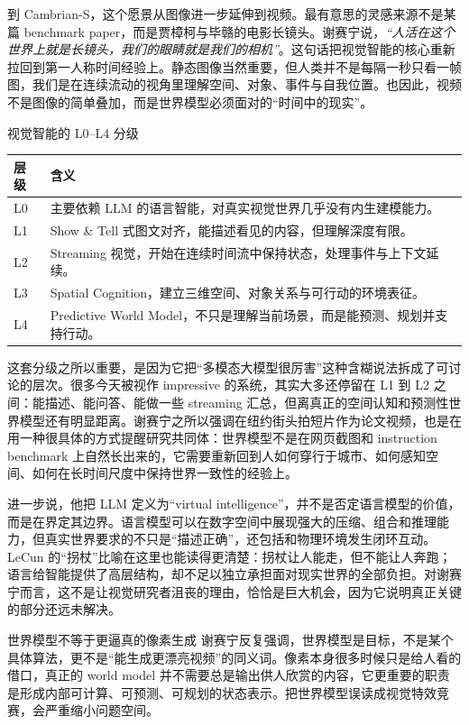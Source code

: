 \documentclass[a4paper,12pt]{article}
\begin{document}
到 Cambrian-S，这个愿景从图像进一步延伸到视频。最有意思的灵感来源不是某篇 benchmark paper，而是贾樟柯与毕赣的电影长镜头。谢赛宁说，\textit{``人活在这个世界上就是长镜头，我们的眼睛就是我们的相机''}。这句话把视觉智能的核心重新拉回到第一人称时间经验上。静态图像当然重要，但人类并不是每隔一秒只看一帧图，我们是在连续流动的视角里理解空间、对象、事件与自我位置。也因此，视频不是图像的简单叠加，而是世界模型必须面对的“时间中的现实”。

\begin{importantbox}{视觉智能的 L0--L4 分级}
\begin{tabularx}{\textwidth}{>{\raggedright\arraybackslash}p{} Y}
\toprule
层级 & 含义 \\
\midrule
L0 & 主要依赖 LLM 的语言智能，对真实视觉世界几乎没有内生建模能力。 \\
L1 & Show \& Tell 式图文对齐，能描述看见的内容，但理解深度有限。 \\
L2 & Streaming 视觉，开始在连续时间流中保持状态，处理事件与上下文延续。 \\
L3 & Spatial Cognition，建立三维空间、对象关系与可行动的环境表征。 \\
L4 & Predictive World Model，不只是理解当前场景，而是能预测、规划并支持行动。 \\
\bottomrule
\end{tabularx}
\end{importantbox}

这套分级之所以重要，是因为它把“多模态大模型很厉害”这种含糊说法拆成了可讨论的层次。很多今天被视作 impressive 的系统，其实大多还停留在 L1 到 L2 之间：能描述、能问答、能做一些 streaming 汇总，但离真正的空间认知和预测性世界模型还有明显距离。谢赛宁之所以强调在纽约街头拍短片作为论文视频，也是在用一种很具体的方式提醒研究共同体：世界模型不是在网页截图和 instruction benchmark 上自然长出来的，它需要重新回到人如何穿行于城市、如何感知空间、如何在长时间尺度中保持世界一致性的经验上。

进一步说，他把 LLM 定义为“virtual intelligence”，并不是否定语言模型的价值，而是在界定其边界。语言模型可以在数字空间中展现强大的压缩、组合和推理能力，但真实世界要求的不只是“描述正确”，还包括和物理环境发生闭环互动。LeCun 的“拐杖”比喻在这里也能读得更清楚：拐杖让人能走，但不能让人奔跑；语言给智能提供了高层结构，却不足以独立承担面对现实世界的全部负担。对谢赛宁而言，这不是让视觉研究者沮丧的理由，恰恰是巨大机会，因为它说明真正关键的部分还远未解决。

\begin{warningbox}{世界模型不等于更逼真的像素生成}
谢赛宁反复强调，世界模型是目标，不是某个具体算法，更不是“能生成更漂亮视频”的同义词。像素本身很多时候只是给人看的借口，真正的 world model 并不需要总是输出供人欣赏的内容，它更重要的职责是形成内部可计算、可预测、可规划的状态表示。把世界模型误读成视觉特效竞赛，会严重缩小问题空间。
\end{warningbox}
\end{document}
